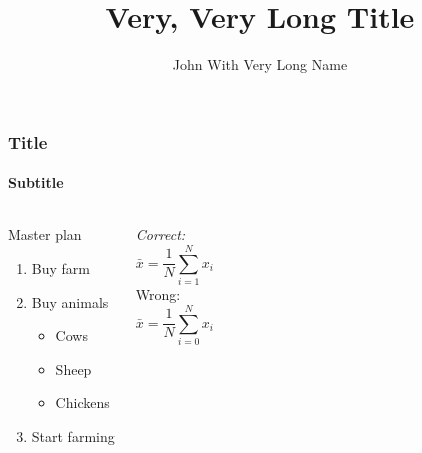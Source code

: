 \documentclass[mathserif]{beamer}
\author[J.W.V.L. Name]{John With Very Long Name}
\title[Short Title]{Very, Very Long Title}
\institute{John's Institute}
\begin{document}
\begin{frame}
\titlepage
\end{frame}

\begin{frame}
	\frametitle{Title}
	\framesubtitle{Subtitle}
	\begin{columns}
		\begin{block}{Master plan}
			\begin{enumerate}
				\item Buy farm
				\pause
				\item Buy animals
				\begin{itemize}
					\item Cows
					\pause
					\item Sheep
					\pause
					\item Chickens
					\pause
				\end{itemize}
				\item Start farming
			\end{enumerate}	
		\end{block}
		\emph{Correct:}
		\begin{equation}
			\bar{x}=\frac{1}{N}\sum_{i=1}^Nx_i
		\end{equation}
		\alert{Wrong:}
		\begin{equation}
			\bar{x}=\frac{1}{N}\sum_{i=0}^Nx_i
		\end{equation}
	\end{columns}
\end{frame}
\end{document}
